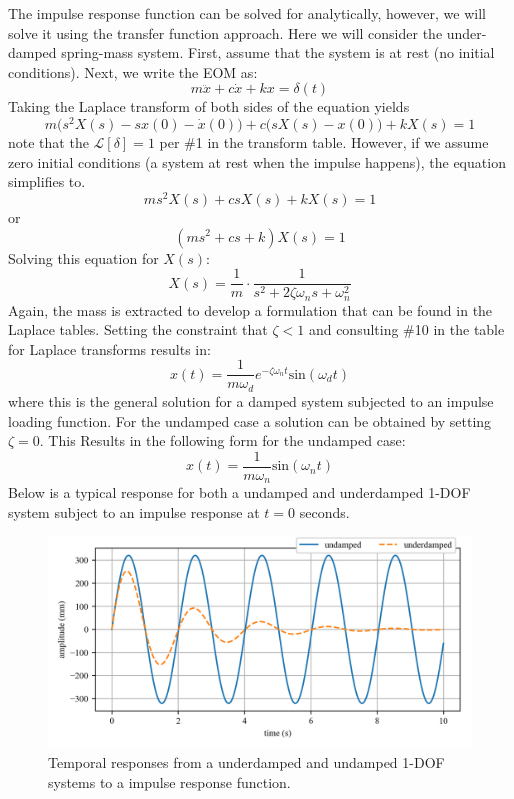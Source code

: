 \documentclass[12pt,letter]{article}
\numberwithin{ex}{section} %
\numberwithin{re}{section} %
\newcommand{\Laplace}[1]{\ensuremath{\mathcal{L}{\left[#1\right]}}}
\begin{document}
The impulse response function can be solved for analytically, however, we will solve it using the transfer function approach. Here we will consider the under-damped spring-mass system. First, assume that the system is at rest (no initial conditions). Next, we write the EOM as:
\begin{equation}
m\ddot{x} +c\dot{x} +kx = \delta(t)
\end{equation}
Taking the Laplace transform of both sides of the equation yields 
\begin{equation}
m\big(s^2X(s)-sx(0) - \dot{x}(0)\big) + c\big(sX(s)-x(0)\big) +kX(s) =1
\end{equation}
note that the $\Laplace{\delta}=1$ per \#1 in the transform table. However, if we assume zero initial conditions (a system at rest when the impulse happens), the equation simplifies to. 
\begin{equation}
ms^2X(s) + csX(s) +kX(s) =1
\end{equation}
or
\begin{equation}
(ms^2 + cs +k)X(s) =1
\end{equation}
Solving this equation for $X(s)$:
\begin{equation}
X(s) = \frac{1}{m} \cdot \frac{1}{s^2 + 2 \zeta \omega_n s + \omega_n^2}
\end{equation}
Again, the mass is extracted to develop a formulation that can be found in the Laplace tables. Setting the constraint that $\zeta<1$ and consulting \#10 in the table for Laplace transforms results in:
\begin{equation}
x(t) = \frac{1}{m \omega_d} e^{-\zeta \omega_n t} \text{sin}(\omega_dt)
\end{equation}
where this is the general solution for a damped system subjected to an impulse loading function. For the undamped case a solution can be obtained by setting $\zeta=0$. This Results in the following form for the undamped case:
\begin{equation}
x(t) = \frac{1}{m \omega_n}\text{sin}(\omega_n t)
\end{equation}
Below is a typical response for both a undamped and underdamped 1-DOF system subject to an impulse response at $t=0$ seconds. 
\begin{figure}[H]
	\centering
	\includegraphics[]{../Figures/response_impulse.png}
	\caption{Temporal responses from a underdamped and undamped 1-DOF systems to a impulse response function.}
\end{figure}
\end{document}
